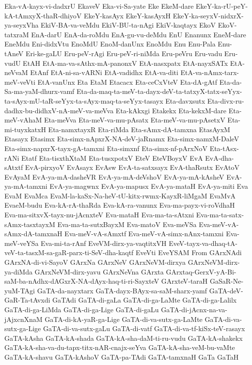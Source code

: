 {Eka-vA-kayx-vi-dadxrU
EkaveV
Eka-vi-Sa-yate
Eke
EkeM-dare
EkeY-ka-rU-peY-kA-tAmxyX-thaR-dhiyoV
EkeY-kasAyx
EkeY-kasAyxH
EkeY-ka-seyxV-nidxrX-ya-seyxVha
EkiV-BA-va-veMdu
EkiV-BU-ta-nAgi
EkiV-kaqtayx
EkoV
EkoV-tatxraM
EnA-darU
EnA-da-roMdu
EnA-gu-vu-deMdu
EnU
Enanunx
EneM-dare
EneMdu
Eni-didxVtu
EnoMdU
EnoM-danUnx
EnoMdu
Enu
Enu-Pala
Enu-tAneV
Eri-ke-gaLU
Eru-peV-rAgi
Eru-peV-ri-niMda
Eru-peVru
Eru-vadu
Eru-vudU
EtAH
EtA-ma-va-sAthx-mA-panonxV
EtA-nasxpatx
EtA-nayxSATx
EtA-neVvaM
EtAnf
EtA-ni-sa-vARNi
EtA-vadidhx
EtA-va-diti
EtA-va-nAmx-tarx-meV-veVti
EtA-vanUnx
Eta
EtaM
Etacacx
Eta-ceCxVteV
Eta-dA-gAtf
Eta-da-Sa-ma-yaM-dhurx-vamf
Eta-da-maq-ta-meV-ta-dayx-deV-ta-tatxyX-tatx-seYyx-ta-sAyx-mU-taR-seYyx-ta-sAyx-maq-ta-seYyx-tasayx
Eta-davxsutx
Eta-divx-ru-dadhx-bu-didhxV-nA-meV-va-meVva
Eta-kAkxgi
Etakekx
Eta-kekxM-dare
Eta-meV-vAhaM
Eta-meVva
Eta-meV-va-mu-pAsatx
Eta-meV-va-mu-pAsetxV
Eta-mi-tuyxkatxH
Eta-namxtayxR
Eta-riMda
Eta-sAmx-dA-tamxna
EtasAyxM
Etasayx
Etasimx
Eta-simx-nApxrX-NA-deV-jaRnamx
Eta-simx-namxM-DaleV
Eta-simx-napxrX-tayx-gA-tamxni
Eta-simxnf
Eta-simx-nf-pArxNoV
Eta-tAsx-rANi
Etatf
Eta-tisxthXtaM
Eta-tusxpotxV
EteV
EteVBoyxV
EvA
EvA-dha-sAtxtf
EvA-pirxyoV
EvAsayx
EvAsw
EvA-ta-satxsayx
EvA-thaRsutx
EvAtoV
EvAyaM
EvA-ya-mA-dasheVR
EvA-ya-mA-deVshoV
EvA-ya-mA-kAsheV
EvA-ya-mA-tamxni
EvA-ya-magwnx
EvA-ya-mapusx
EvA-ya-mataH
EvA-ya-miti
Eva
EvaM
EvaMca
EvaM-la-kaSx-Na-heV-tU-kitx-rwmx-KayxR-liMgaM
EvaMvA
EvaeM-budu
Eva-kA-rA-thaRda
Eva-kA-ra-vanunx
Eva-ma-payx-vi-roVdhaH
Eva-ma-sitxvX-tayx-nu-jAcnxteV
Eva-mataH
Eva-ma-ta-sAtxni
Eva-ma-ta-satx-sAmx-tasxtayxM
Eva-ma-ta-sutxBayxM
Eva-matoV
Eva-meVSa
Eva-meV-vA-sAmx-dA-tamxnaH
Eva-meV-vA-sAmxtf
Eva-meV-vA-simx-nAnx-tamxni
Eva-meV-veYSa
Eva-mi-ta-rAnf
EveVM-dirx-ya-vaqtitxVH
EveV-tayx-va-dhaq-tA-veV-ta-tasxM-sa-gaR-parx-ti-SeV-dha-kaqtf
EveVti
EveYSAM
From
GArxNAdi
GArxNA-di-vi-SayoV
GArxNa
GArxNeV
GArxNeVM-dirxya
GArxNeVM-dirx-ya-diMda
GArxNeVM-dirx-yavu
GArxNeVna
GArxta
GArxtaq-GerxV-yA-Bi-saM-ba-nAdhx-dAGxrX-NA-dAyx-haq-ti-ri-SayxteV
GArxteV-taraH
GaSaR-Ne-yuM-TAgi
GaTA-da-nayxtarx
GaTA-dayx-BAyx-sa-saM-sharx-yamf
GaTA-deV-GaR-Ta-tAvxdi
GaTAdi
GaTA-di-gaLa
GaTA-di-ga-LaMte
GaTA-di-ga-Lalilx
GaTA-di-ga-LiMda
GaTA-di-ga-Lige
GaTA-di-gaLu
GaTA-di-jAcnx-na-va-jAjxcnXnaM
GaTA-di-kA-yaR-ga-Lige
GaTA-di-va-sutx-ga-LaMte
GaTA-di-va-sutx-ga-Lige
GaTA-di-va-sutx-gaLu
GaTA-di-vatf
GaTA-di-va-tf-kiSx-teV-rasayx
GaTA-kAsha
GaTA-kA-shada
GaTA-kA-sha-daM-ti-ru-vudu
GaTA-kA-shakekx
GaTA-kA-sha-va-du-tapx-titx-nAR-cnajx-seYva
GaTA-kA-sha-veM-bu-vaMte
GaTA-kA-shavu
GaTA-kAshoV
GaTA-pa-TAdi
GaTA-tamxnaH
GaTa
GaTaH
}
